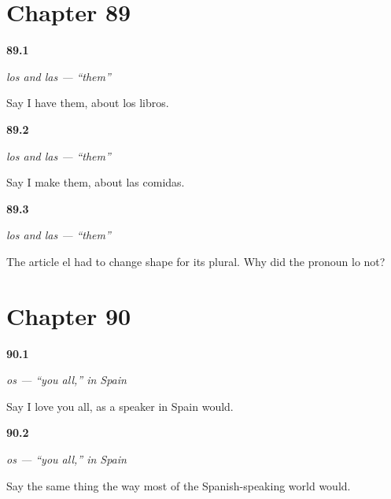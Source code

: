 \section*{Chapter 89}

\noindent\begin{minipage}[t]{\linewidth}
\raggedright
\hypertarget{review-ES-C45-los-las-books}{\textbf{89.1}} \emph{los and las — \textquotedblleft{}them\textquotedblright{}}\par
\small Say I have them, about los libros.
\end{minipage}\par\medskip

\noindent\begin{minipage}[t]{\linewidth}
\raggedright
\hypertarget{review-ES-C45-los-las-meals}{\textbf{89.2}} \emph{los and las — \textquotedblleft{}them\textquotedblright{}}\par
\small Say I make them, about las comidas.
\end{minipage}\par\medskip

\noindent\begin{minipage}[t]{\linewidth}
\raggedright
\hypertarget{review-ES-C45-los-las-tidy}{\textbf{89.3}} \emph{los and las — \textquotedblleft{}them\textquotedblright{}}\par
\small The article el had to change shape for its plural. Why did the pronoun lo not?
\end{minipage}\par\medskip

\section*{Chapter 90}

\noindent\begin{minipage}[t]{\linewidth}
\raggedright
\hypertarget{review-ES-C45-os-say}{\textbf{90.1}} \emph{os — \textquotedblleft{}you all,\textquotedblright{} in Spain}\par
\small Say I love you all, as a speaker in Spain would.
\end{minipage}\par\medskip

\noindent\begin{minipage}[t]{\linewidth}
\raggedright
\hypertarget{review-ES-C45-os-other}{\textbf{90.2}} \emph{os — \textquotedblleft{}you all,\textquotedblright{} in Spain}\par
\small Say the same thing the way most of the Spanish-speaking world would.
\end{minipage}\par\medskip

